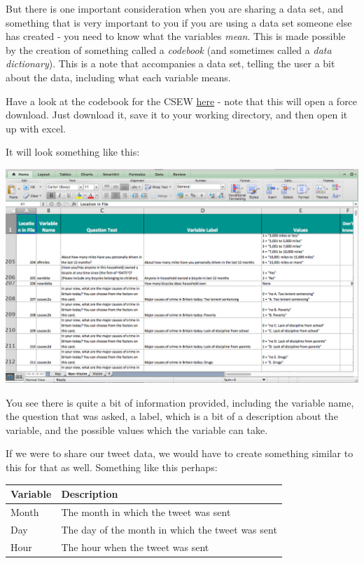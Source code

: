 \documentclass[]{book}
\theoremstyle{definition}
\theoremstyle{definition}
\theoremstyle{definition}
\theoremstyle{remark}
\begin{document}
But there is one important consideration when you are sharing a data
set, and something that is very important to you if you are using a data
set someone else has created - you need to know what the variables
\emph{mean}. This is made possible by the creation of something called a
\emph{codebook} (and sometimes called a \emph{data dictionary}). This is
a note that accompanies a data set, telling the user a bit about the
data, including what each variable means.

Have a look at the codebook for the CSEW
\href{http://doc.ukdataservice.ac.uk/doc/7889/mrdoc/excel/7889_csew_data_dictionary_2002-03_to_2014-15.xlsx}{here}
- note that this will open a force download. Just download it, save it
to your working directory, and then open it up with excel.

It will look something like this:

\includegraphics{imgs/csew_dictionary.png}

You see there is quite a bit of information provided, including the
variable name, the question that was asked, a label, which is a bit of a
description about the variable, and the possible values which the
variable can take.

If we were to share our tweet data, we would have to create something
similar to this for that as well. Something like this perhaps:

\begin{tabular}{l|l}
\hline
Variable & Description\\
\hline
Month & The month in which the tweet was sent\\
\hline
Day & The day of the month in which the tweet was sent\\
\hline
Hour & The hour when the tweet was sent\\
\hline
\end{tabular}
\end{document}

